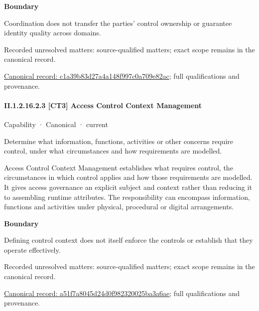 \textbf{Boundary}



Coordination does not transfer the parties' control ownership or guarantee identity quality across domains.


{\small Recorded unresolved matters: source-qualified matters; exact scope remains in the canonical record.}\par
{\footnotesize \href{../../../../../../../continuum/strategy/capability/c1a39b83d27a4a148f997c0a709e82ac.md}{Canonical record: c1a39b83d27a4a148f997c0a709e82ac}; full qualifications and provenance.}\par
\paragraph*{II.1.2.16.2.3 [CT3] Access Control Context Management}
\label{navigation:II.1.2.16.2.3}

\label{element:a51f7a8045d24d0f982320025ba3a6ae}
{\small Capability · Canonical · current}\par

Determine what information, functions, activities or other concerns require control, under what circumstances and how requirements are modelled.



Access Control Context Management establishes what requires control, the circumstances in which control applies and how those requirements are modelled. It gives access governance an explicit subject and context rather than reducing it to assembling runtime attributes. The responsibility can encompass information, functions and activities under physical, procedural or digital arrangements.



\textbf{Boundary}



Defining control context does not itself enforce the controls or establish that they operate effectively.


{\small Recorded unresolved matters: source-qualified matters; exact scope remains in the canonical record.}\par
{\footnotesize \href{../../../../../../../continuum/strategy/capability/a51f7a8045d24d0f982320025ba3a6ae.md}{Canonical record: a51f7a8045d24d0f982320025ba3a6ae}; full qualifications and provenance.}\par
